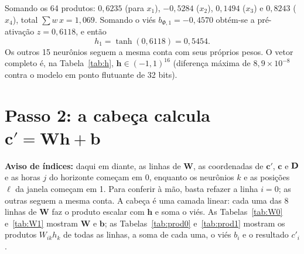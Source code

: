 \documentclass[11pt,a4paper]{article}
\newcommand{\bh}{\mathbf{h}}\newcommand{\bW}{\mathbf{W}}\newcommand{\bb}{\mathbf{b}}\newcommand{\bc}{\mathbf{c}}
\begin{document}
Somando os 64 produtos: $0,6235$ (para $x_1$), $-0,5284$ ($x_2$), $0,1494$ ($x_3$) e $0,8243$ ($x_4$), total $\sum w\,x=1,069$. Somando o viés $b_{\Phi,1}=-0,4570$ obtém-se a pré-ativação $z=0,6118$, e então
\[h_1=\tanh(0,6118)=0,5454.\]
Os outros 15 neurônios seguem a mesma conta com seus próprios pesos. O vetor completo é, na Tabela~\ref{tab:h}, $\bh\in(-1,1)^{16}$ (diferença máxima de $8,9\times 10^{-8}$ contra o modelo em ponto flutuante de 32 bits).

\begin{table}[H]
\centering
\caption{A representação latente $\bh$.}\label{tab:h}
\scriptsize
{}
\par\vspace{2pt}{\footnotesize Fonte: elaborado pelo autor.}
\end{table}

\section{Passo 2: a cabeça calcula $\bc'=\bW\bh+\bb$}\label{sec:cprime}

\textbf{Aviso de índices:} daqui em diante, as linhas de $\bW$, as coordenadas de $\bc'$, $\bc$ e $\mathbf{D}$ e as horas $j$ do horizonte começam em 0, enquanto os neurônios $k$ e as posições $\ell$ da janela começam em 1. Para conferir à mão, basta refazer a linha $i=0$; as outras seguem a mesma conta. A cabeça é uma camada linear: cada uma das $8$ linhas de $\bW$ faz o produto escalar com $\bh$ e soma o viés. As Tabelas~\ref{tab:W0} e~\ref{tab:W1} mostram $\bW$ e $\bb$; as Tabelas~\ref{tab:prod0} e~\ref{tab:prod1} mostram os produtos $W_{ik}h_k$ de todas as linhas, a soma de cada uma, o viés $b_i$ e o resultado $c'_i$.
\end{document}
